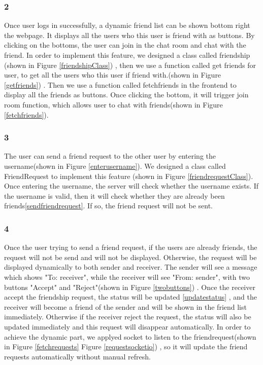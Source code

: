 \documentclass[12pt]{article}
\begin{document}
        \subsubsection*{2} Once user logs in successfully, a dynamic friend list can be shown bottom right the webpage. It displays all the users who this user is friend with as buttons. By clicking on the bottoms, the user can join in the chat room and chat with the friend. In order to implement this feature, we designed a class called friendship (shown in Figure \ref{friendshipClass}) , then we use a function called get friends for user, to get all the users who this user if friend with.(shown in Figure \ref{getfriends}) . Then we use a function called fetchfriends in the frontend to display all the friends as buttons. Once clicking the bottom, it will trigger join room function, which allows user to chat with friends(shown in Figure \ref{fetchfriends}).

        \subsubsection*{3} The user can send a friend request to the other user by entering the username(shown in Figure \ref{enterusername}). We designed a class called FriendRequest to implement this feature (shown in Figure \ref{friendrequestClass}). Once entering the username, the server will check whether the username exists. If the username is valid, then it will check whether they are already been friends\ref{sendfriendrequest}. If so, the friend request will not be sent.
	
	   \subsubsection*{4} Once the user trying to send a friend request, if the users are already friends, the request will not be send and will not be displayed. Otherwise, the request will be displayed dynamically to both sender and receiver. The sender will see a message which shows "To: receiver", while the receiver will see "From: sender", with two buttons "Accept" and "Reject"(shown in Figure \ref{twobuttons}) . Once the receiver accept the friendship request, the status will be updated \ref{updatestatus} , and the receiver will become a friend of the sender and will be shown in the friend list immediately. Otherwise if the receiver reject the request, the status will also be updated immediately and this request will disappear automatically.  In order to achieve the dynamic part, we applyed socket to listen to the friendrequest(shown in Figure  \ref{fetchrequests} Figure \ref{requestsocketio}) , so it will update the friend requests automatically without manual refresh.
        \newpage
\end{document}

